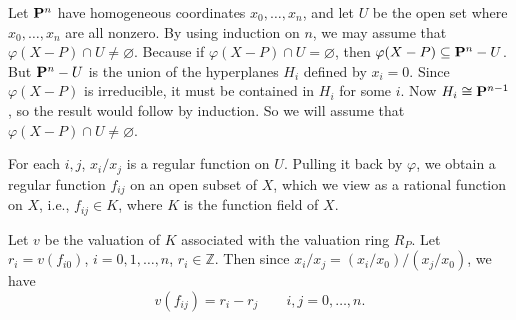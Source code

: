 {Let $\mathbf{P}^n$ have homogeneous coordinates $x_0,\ldots,x_n$, and let $U$ be the open set where $x_0,\ldots,x_n$ are all nonzero. By using induction on $n$, we may assume that $\varphi(X-P)\cap U\ne\varnothing$. Because if $\varphi(X-P)\cap U=\varnothing$, then $\varphi(X-P)\subseteq\mathbf{P}^n-U$. But $\mathbf{P}^n-U$ is the union of the hyperplanes $H_i$ defined by $x_i=0$. Since $\varphi(X-P)$ is irreducible, it must be contained in $H_i$ for some $i$. Now $H_i\cong\mathbf{P}^{n-1}$, so the result would follow by induction. So we will assume that $\varphi(X-P)\cap U\ne\varnothing$.

For each $i,j$, $x_i/x_j$ is a regular function on $U$. Pulling it back by $\varphi$, we obtain a regular function $f_{ij}$ on an open subset of $X$, which we view as a rational function on $X$, i.e., $f_{ij}\in K$, where $K$ is the function field of $X$.

Let $v$ be the valuation of $K$ associated with the valuation ring $R_P$. Let $r_i=v(f_{i0})$, $i=0,1,\ldots,n$, $r_i\in\mathbb Z$. Then since $x_i/x_j=(x_i/x_0)/(x_j/x_0)$, we have
\[
v(f_{ij})=r_i-r_j\qquad i,j=0,\ldots,n.
\]}
